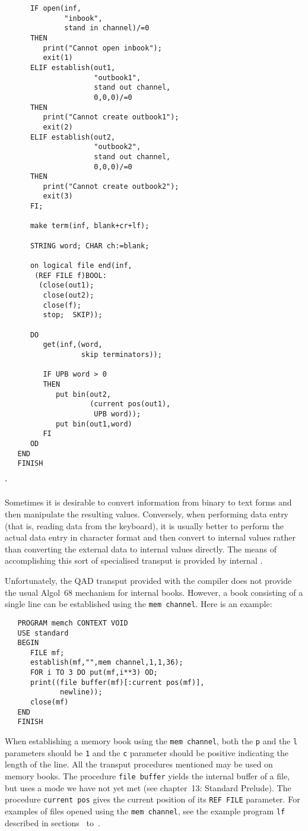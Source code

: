 \begin{exercise}
\begin{verbatim}
      IF open(inf,
              "inbook",
              stand in channel)/=0
      THEN
         print("Cannot open inbook");
         exit(1)
      ELIF establish(out1,
                     "outbook1",
                     stand out channel,
                     0,0,0)/=0
      THEN
         print("Cannot create outbook1");
         exit(2)
      ELIF establish(out2,
                     "outbook2",
                     stand out channel,
                     0,0,0)/=0
      THEN
         print("Cannot create outbook2");
         exit(3)
      FI;

      make term(inf, blank+cr+lf);

      STRING word; CHAR ch:=blank;

      on logical file end(inf,
       (REF FILE f)BOOL:
        (close(out1);
         close(out2);
         close(f);
         stop;  SKIP));

      DO
         get(inf,(word,
                  skip terminators));

         IF UPB word > 0
         THEN
            put bin(out2,
                    (current pos(out1),
                     UPB word));
            put bin(out1,word)
         FI
      OD
   END
   FINISH
\end{verbatim}
'
\end{exercise}

Sometimes it is desirable to convert information from binary to text
forms and then manipulate the resulting values. Conversely, when
performing data entry (that is, reading data from the keyboard), it is
usually better to perform the actual data entry in character format and
then convert to internal values rather than converting the external
data to internal values directly. The means of accomplishing this sort
of specialised transput is provided by internal
.

Unfortunately, the QAD transput provided with the 
compiler does not provide the usual Algol~68 mechanism for internal
books. However, a book consisting of a single line can be established
using the \verb|mem channel|. Here is an example:
\begin{verbatim}
   PROGRAM memch CONTEXT VOID
   USE standard
   BEGIN
      FILE mf;
      establish(mf,"",mem channel,1,1,36);
      FOR i TO 3 DO put(mf,i**3) OD;
      print((file buffer(mf)[:current pos(mf)],
             newline));
      close(mf)
   END
   FINISH
\end{verbatim}
\noindent
When establishing a memory book using the \verb|mem channel|, both the
\verb|p| and the \verb|l| parameters should be \verb|1| and the \verb|c|
parameter should be positive indicating the length of the line. All the
transput procedures mentioned may be used on memory books. The procedure
\verb|file buffer| yields the internal buffer of a file, but uses a
mode we have not yet met (see chapter~13: Standard Prelude). The
procedure \verb|current pos| gives the current position of its
\verb|REF FILE| parameter. For examples of files opened using the
\verb|mem channel|, see the example program \verb|lf| described in
sections~ to~.

